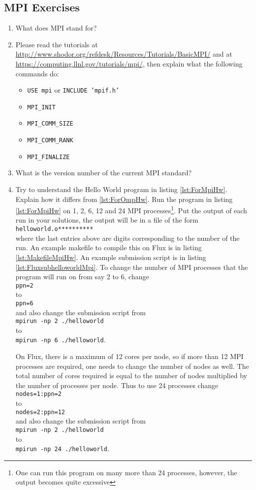 \subsection{MPI Exercises}
\begin{enumerate}
\item[1)] What does MPI stand for?
\item[2)] Please read the tutorials at \url{http://www.shodor.org/refdesk/Resources/Tutorials/BasicMPI/} and at \url{https://computing.llnl.gov/tutorials/mpi/}, then explain what the following commands do:
\begin{itemize}
\item \texttt{USE mpi} or \texttt{INCLUDE 'mpif.h'} 
\item \texttt{MPI\_INIT}
\item \texttt{MPI\_COMM\_SIZE}
\item \texttt{MPI\_COMM\_RANK}
\item \texttt{MPI\_FINALIZE}
\end{itemize}
\item[3)] What is the version number of the current MPI standard?
\item[3)] Try to understand the Hello World program in listing \ref{lst:ForMpiHw}. Explain how it differs from \ref{lst:ForOmpHw}. Run the program in listing \ref{lst:ForMpiHw} on 1, 2, 6, 12 and 24 MPI processes\footnote{One can run this program on many more than 24 processes, however, the output becomes quite excessive}. Put the output of each run in your solutions, the output will be in a file of the form\\ 
\texttt{helloworld.o**********}\\
where the last entries above are digits corresponding to the number of the run. An example makefile to compile this on Flux is in listing \ref{lst:MakefileMpiHw}. An example submission script is in listing \ref{lst:FluxsubhelloworldMpi}. To change the number of MPI processes that the program will run on from say 2 to 6,  change \\
\texttt{ppn=2}\\ 
to\\ 
\texttt{ppn=6}\\
and also change the submission script from\\
\texttt{mpirun -np 2 ./helloworld}\\ 
to\\ 
\texttt{mpirun -np 6 ./helloworld}.

On Flux, there is a maximum of 12 cores per node, so if more than 12 MPI processes are required, one needs to change the number of nodes as well. The total number of cores required is equal to the number of nodes multiplied by the number of processes per node. Thus to use 24 processes change  \\
\texttt{nodes=1:ppn=2}\\ 
to\\ 
\texttt{nodes=2:ppn=12}\\
and also change the submission script from\\
\texttt{mpirun -np 2 ./helloworld}\\ 
to\\ 
\texttt{mpirun -np 24 ./helloworld}.


\end{enumerate}

